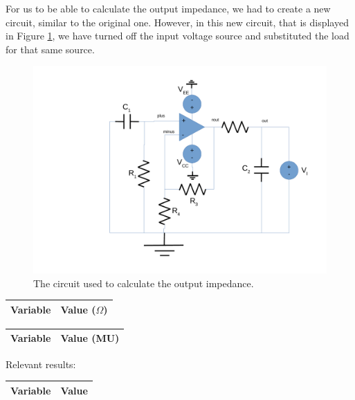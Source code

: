 For us to be able to calculate the output impedance, we had to create a new circuit, similar to the original one. However, in this new circuit, that is displayed in Figure \ref{fig:circuit-out}, we have turned off the input voltage source and substituted the load for that same source.

\begin{figure}[H] \centering
\includegraphics[width=0.6\linewidth]{circuit-out.pdf}
\caption{The circuit used to calculate the output impedance.}
\label{fig:circuit-out}
\end{figure}

\begin{center}
\begin{tabular}{|l|r|}
  \hline    
  {\bf Variable} & {\bf Value ($\Omega$)} \\ \hline
  
\end{tabular}
\end{center}

\begin{center}
\begin{tabular}{|l|r|}
  \hline    
  {\bf Variable} & {\bf Value (MU)} \\ \hline
  
\end{tabular}
\end{center}

Relevant results:


\begin{center}
\begin{tabular}{|l|r|}
  \hline    
  {\bf Variable} & {\bf Value} \\ \hline
  
\end{tabular}
\end{center}